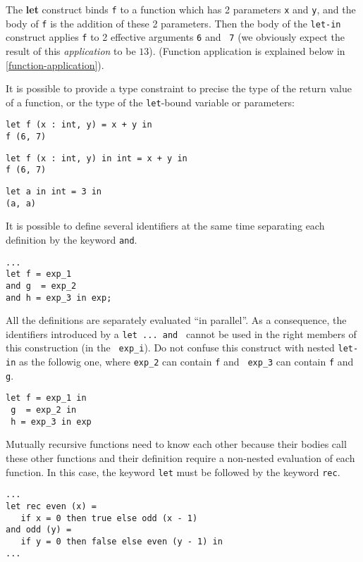 The {\bf let} construct binds {\tt f} to a function which has 2
parameters {\tt x} and {\tt y}, and the body of {\tt f} is the
addition of these 2 parameters. Then the body of the {\tt let-in}
construct applies {\tt f} to 2 effective arguments {\tt 6} and {\tt
  7} (we obviously expect the result of this {\em application} to be
$13$).  (Function application is explained below in
\ref{function-application}).

It is possible to provide a type constraint to precise the type of the
return value of a function, or the type of the {\tt let}-bound
variable or parameters:

{\scriptsize
\begin{lstlisting}
let f (x : int, y) = x + y in
f (6, 7)
\end{lstlisting}}
{\scriptsize
\begin{lstlisting}
let f (x : int, y) in int = x + y in
f (6, 7)
\end{lstlisting}}
{\scriptsize
\begin{lstlisting}
let a in int = 3 in
(a, a)
\end{lstlisting}}



\medskip
It is possible to define several identifiers at the same time separating
each definition by the keyword {\tt and}.

{\scriptsize
\begin{lstlisting}
...
let f = exp_1
and g  = exp_2
and h = exp_3 in exp;
\end{lstlisting}}

All the definitions are separately evaluated ``in parallel''.  As a
consequence, the identifiers introduced by a {\tt let ... and }
cannot be used in the right members of this construction (in the {\tt
  exp\_i}). Do not confuse this construct with nested {\tt let-in} as
the followig one, where {\tt exp\_2} can contain {\tt f} and {\tt
  exp\_3} can contain {\tt f} and {\tt g}.

{\scriptsize
\begin{lstlisting}
let f = exp_1 in
 g  = exp_2 in
 h = exp_3 in exp
\end{lstlisting}}

Mutually recursive functions need to know each other because their
bodies call these other functions and their definition require a
non-nested evaluation of each function.  In this case, the keyword
{\tt let} must be followed by the keyword {\tt rec}.

{\scriptsize
\begin{lstlisting}
...
let rec even (x) =
   if x = 0 then true else odd (x - 1)
and odd (y) =
   if y = 0 then false else even (y - 1) in
...
\end{lstlisting}}

